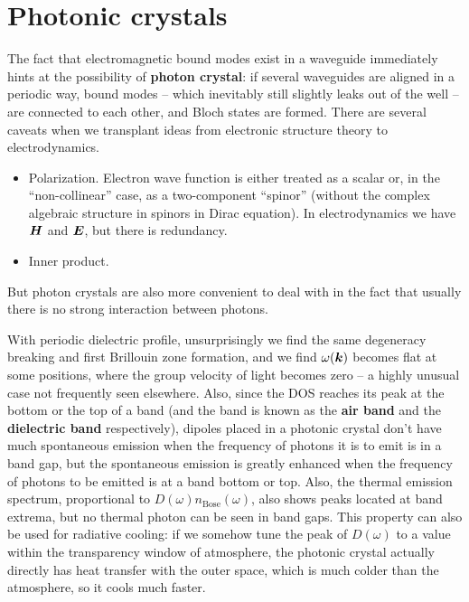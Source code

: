 \documentclass[hyperref, a4paper]{article}
\newcommand*{\concept}[1]{{\textbf{#1}}}
\begin{document}
\section{Photonic crystals}

The fact that electromagnetic bound modes exist in a waveguide 
immediately hints at the possibility of \concept{photon crystal}:
if several waveguides are aligned in a periodic way, 
bound modes -- which inevitably still slightly leaks out of the well -- 
are connected to each other, 
and Bloch states are formed.
There are several caveats when we transplant ideas 
from electronic structure theory to electrodynamics.
\begin{itemize}
    \item Polarization. Electron wave function is either treated as a scalar or, in the ``non-collinear'' case, 
    as a two-component ``spinor'' 
    (without the complex algebraic structure in spinors in Dirac equation).
    In electrodynamics we have $\vb*{H}$ and $\vb*{E}$,
    but there is redundancy.
    \item Inner product. 
\end{itemize}
But photon crystals are also more convenient to deal with 
in the fact that usually there is no strong interaction between photons.

With periodic dielectric profile, 
unsurprisingly we find the same degeneracy breaking 
and first Brillouin zone formation, 
and we find $\omega(\vb*{k})$ becomes flat at some positions, 
where the group velocity of light becomes zero 
-- a highly unusual case not frequently seen elsewhere.
Also, since the DOS reaches its peak 
at the bottom or the top of a band
(and the band is known as the \concept{air band} 
and the \concept{dielectric band} respectively), 
dipoles placed in a photonic crystal don't have much spontaneous emission 
when the frequency of photons it is to emit is in a band gap,
but the spontaneous emission is greatly enhanced 
when the frequency of photons to be emitted 
is at a band bottom or top.
Also, the thermal emission spectrum, 
proportional to $D(\omega) n_{\text{Bose}}(\omega)$, 
also shows peaks located at band extrema, 
but no thermal photon can be seen in band gaps.
This property can also be used for radiative cooling:
if we somehow tune the peak of $D(\omega)$ to a value 
within the transparency window of atmosphere, 
the photonic crystal actually directly has heat transfer 
with the outer space, which is much colder than the atmosphere, 
so it cools much faster.
\end{document}
